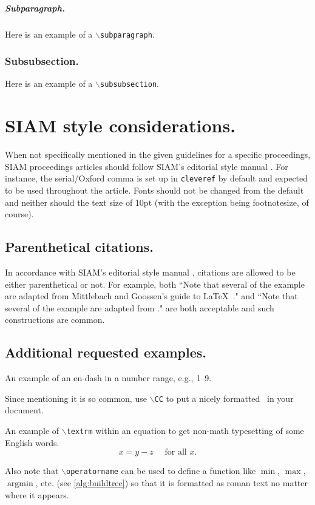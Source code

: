\documentclass[twoside,leqno,twocolumn]{article}
\begin{document}
\subparagraph{Subparagraph.}
Here is an example of a $\backslash$\texttt{subparagraph}.

\subsubsection{Subsubsection.}
Here is an example of a $\backslash$\texttt{subsubsection}.

\section{SIAM style considerations.}
\label{sec:style}
When not specifically mentioned in the given guidelines for a specific proceedings, SIAM proceedings articles should follow
SIAM's editorial style manual \cite{siam}. For instance, the serial/Oxford comma is set up in \texttt{cleveref} by default
and expected to be used throughout the article. Fonts should not be changed from the default and neither should the text size
of 10pt (with the exception being footnotesize, of course).

\subsection{Parenthetical citations.}
In accordance with SIAM's editorial style manual \cite{siam}, citations are allowed to be either parenthetical or not. For 
example, both ``Note that several of the example are adapted from Mittlebach and Goossen's guide to \LaTeX~\cite{MiGo04}." 
and ``Note that several of the example are adapted from \cite{MiGo04}." are both acceptable and such constructions are common.

\subsection{Additional requested examples.}
An example of an en-dash in a number range, e.g., 1--9.

Since mentioning it is so common, use $\backslash$\texttt{CC} to put a nicely formatted \CC~in your document.

An example of $\backslash$\texttt{textrm} within an equation to get non-math typesetting of some English words. 
$$x=y-z \quad \textrm{ for all } x.$$

Also note that $\backslash$\texttt{operatorname} can be used to define a function like $\operatorname{min}$, $\operatorname{max}$, 
$\operatorname{argmin}$, etc. (see \cref{alg:buildtree}) so that it is formatted as roman text no matter where it appears.
\end{document}
